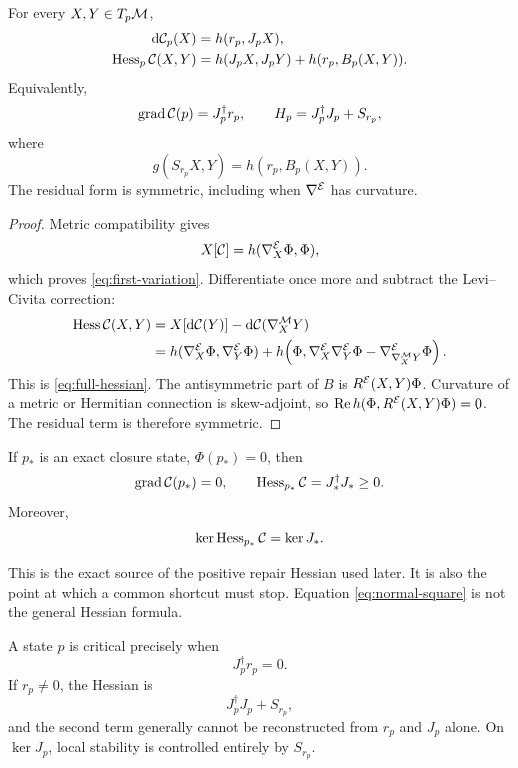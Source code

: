 \documentclass[11pt,a4paper]{article}
\begin{document}
\begin{theorem}
\label{thm:residual-hessian}
For every \(X,Y\in T_p\mathcal{M}\),
\begin{align}
\mathrm{d}\mathcal{C}_p(X)&=h(r_p,J_pX),
\label{eq:first-variation}\\
\operatorname{Hess}_p\mathcal{C}(X,Y)&=
h(J_pX,J_pY)+h(r_p,B_p(X,Y)).
\label{eq:full-hessian}
\end{align}
Equivalently,
\begin{equation}
\operatorname{grad}\mathcal{C}(p)=J_p^{\dagger}r_p,
\qquad
H_p=J_p^{\dagger}J_p+S_{r_p},
\label{eq:operator-hessian}
\end{equation}
where
\[
g(S_{r_p}X,Y)=h(r_p,B_p(X,Y)).
\]
The residual form is symmetric, including when \(\nabla^{\mathcal{E}}\) has
curvature.
\end{theorem}

\begin{proof}
Metric compatibility gives
\[
X[\mathcal{C}]=h(\nabla_X^{\mathcal{E}}\Phi,\Phi),
\]
which proves \eqref{eq:first-variation}.  Differentiate once more and
subtract the Levi--Civita correction:
\begin{align*}
\operatorname{Hess}\mathcal{C}(X,Y)
&=X[\mathrm{d}\mathcal{C}(Y)]-\mathrm{d}\mathcal{C}(\nabla_X^{\mathcal{M}}Y)\\
&=h(\nabla_X^{\mathcal{E}}\Phi,\nabla_Y^{\mathcal{E}}\Phi)
+h\!\left(\Phi,
\nabla_X^{\mathcal{E}}\nabla_Y^{\mathcal{E}}\Phi
-\nabla_{\nabla_X^{\mathcal{M}}Y}^{\mathcal{E}}\Phi\right).
\end{align*}
This is \eqref{eq:full-hessian}.  The antisymmetric part of \(B\) is
\(R^{\mathcal{E}}(X,Y)\Phi\).  Curvature of a metric or Hermitian connection is
skew-adjoint, so
\(\operatorname{Re}h(\Phi,R^{\mathcal{E}}(X,Y)\Phi)=0\).  The residual term is
therefore symmetric.
\end{proof}

\begin{corollary}
\label{cor:zero-normal-square}
If \(p_*\) is an exact closure state, \(\Phi(p_*)=0\), then
\begin{equation}
\operatorname{grad}\mathcal{C}(p_*)=0,
\qquad
\operatorname{Hess}_{p_*}\mathcal{C}=J_*^{\dagger}J_*\geq0.
\label{eq:normal-square}
\end{equation}
Moreover,
\[
\ker\operatorname{Hess}_{p_*}\mathcal{C}=\ker J_*.
\]
\end{corollary}

This is the exact source of the positive repair Hessian used later.  It is
also the point at which a common shortcut must stop.  Equation
\eqref{eq:normal-square} is not the general Hessian formula.

\begin{corollary}
\label{cor:nonzero-correction}
A state \(p\) is critical precisely when
\[
J_p^{\dagger}r_p=0.
\]
If \(r_p\neq0\), the Hessian is
\[
J_p^{\dagger}J_p+S_{r_p},
\]
and the second term generally cannot be reconstructed from \(r_p\) and
\(J_p\) alone.  On \(\ker J_p\), local stability is controlled entirely by
\(S_{r_p}\).
\end{corollary}
\end{document}
